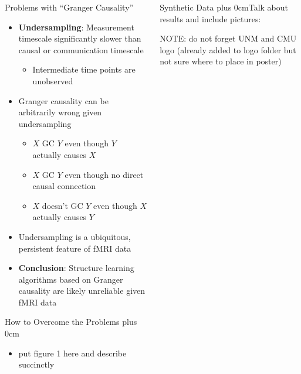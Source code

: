 \documentclass[final,hyperref={pdfpagelabels=false}]{beamer}
\renewcommand{\raggedright}{\leftskip=0.5cm \rightskip=0.5cm plus 0cm}
\begin{document}
\begin{frame}{}
\begin{columns}[t]
\begin{column}{.48\linewidth}
\begin{block}{\Large Problems with ``Granger Causality''}
\begin{itemize}
          \item \textbf{Undersampling}: Measurement timescale significantly slower than
          causal or communication timescale 
          \begin{itemize} \item Intermediate time points are unobserved \end{itemize}
          
          \item Granger causality can be arbitrarily wrong given undersampling
          \begin{itemize}
            \item $X$ GC $Y$ even though $Y$ actually causes $X$
            \item $X$ GC $Y$ even though no direct causal connection
            \item $X$ doesn't GC $Y$ even though $X$ actually causes $Y$
            \end{itemize}
          
          \item Undersampling is a ubiquitous, persistent feature of fMRI data
          
          \item \textbf{Conclusion}: Structure learning algorithms based on Granger causality
          are likely unreliable given fMRI data
          \end{itemize}
        \end{block}

        \begin{block}{\Large How to Overcome the Problems}
          \raggedright  
          \begin{itemize}
          \item put figure 1 here and describe succinctly 
          \end{itemize}
        \end{block}
  

      \end{column}
      \begin{column}{.48\linewidth}
        \begin{block}{\Large Synthetic Data}
          \raggedright Talk about results and include pictures: \vskip5cm

         NOTE: do not forget UNM and CMU logo (already added to logo folder but not sure where to place in poster)

          \vskip5.5cm
        \end{block}
        

\end{column}
\end{columns}
\end{frame}
\end{document}
